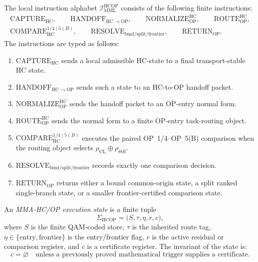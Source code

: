 \begin{definition}
\label{def:minimal-mml-hcop-instruction-alphabet}
The local instruction alphabet \(\mathcal I_{\mathrm{MML}}^{\mathrm{HCOP}}\) consists of the following finite instructions:
\[
\begin{gathered}
 \mathrm{CAPTURE}_{\mathrm{HC}},\qquad
 \mathrm{HANDOFF}_{\mathrm{HC}\to\mathrm{OP}},\qquad
 \mathrm{NORMALIZE}_{\mathrm{OP}}^{\mathrm{HC}},\qquad
 \mathrm{ROUTE}_{\mathrm{OP}}^{\mathrm{HC}},\\
 \mathrm{COMPARE}_{\mathrm{HC}}^{1/4\mid 5(B)},\qquad
 \mathrm{RESOLVE}_{\mathrm{bind/split/frontier}},\qquad
 \mathrm{RETURN}_{\mathrm{OP}}.
\end{gathered}
\]
The instructions are typed as follows:
\begin{enumerate}[leftmargin=2em,label=(\alph*)]
 \item \(\mathrm{CAPTURE}_{\mathrm{HC}}\) sends a local admissible HC-state to a final transport-stable HC state.
 \item \(\mathrm{HANDOFF}_{\mathrm{HC}\to\mathrm{OP}}\) sends such a state to an HC-to-OP handoff packet.
 \item \(\mathrm{NORMALIZE}_{\mathrm{OP}}^{\mathrm{HC}}\) sends the handoff packet to an OP-entry normal form.
 \item \(\mathrm{ROUTE}_{\mathrm{OP}}^{\mathrm{HC}}\) sends the normal form to a finite OP-entry task-routing object.
 \item \(\mathrm{COMPARE}_{\mathrm{HC}}^{1/4\mid 5(B)}\) executes the paired OP~1/4--OP~5(B) comparison when the routing object selects \(\rho_{\mathrm{CL}}\oplus\rho_{\Theta R}\).
 \item \(\mathrm{RESOLVE}_{\mathrm{bind/split/frontier}}\) records exactly one comparison decision.
 \item \(\mathrm{RETURN}_{\mathrm{OP}}\) returns either a bound common-origin state, a split ranked single-branch state, or a smaller frontier-certified comparison state.
\end{enumerate}
\end{definition}

\begin{definition}
\label{def:mma-execution-state-for-hcop-program}
An \emph{MMA-HC/OP execution state} is a finite tuple
\[
 \Sigma_{\mathrm{HCOP}}
 =
 \bigl(
 S,
 \tau,
 \eta,
 r,
 c
 \bigr),
\]
where \(S\) is the finite QAM-coded store, \(\tau\) is the inherited route tag, \(\eta\in\{\mathrm{entry},\mathrm{frontier}\}\) is the entry/frontier flag, \(r\) is the active residual or comparison register, and \(c\) is a certificate register. The invariant of the state is:
\[
 c=\varnothing
 \quad\text{unless a previously proved mathematical trigger supplies a certificate.}
\]
\end{definition}

